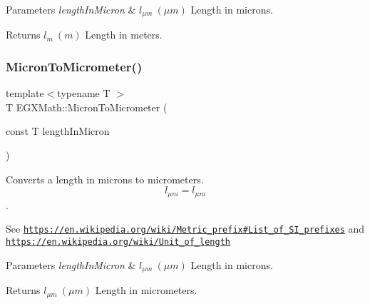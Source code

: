 \begin{DoxyParams}{Parameters}
{\em length\+In\+Micron} & $ l_{\mu m}\ (\mu m)$ Length in microns. \\
\hline
\end{DoxyParams}
\begin{DoxyReturn}{Returns}
$ l_{m}\ (m)$ Length in meters. 
\end{DoxyReturn}
\mbox{\label{group___e_g_x_math-_conversions-_length_conversions-_non-_s_i-_micron-_s_i_gaf65c3c52f13b30b32ae35c4b8edc30a8}} 
\subsubsection{\texorpdfstring{Micron\+To\+Micrometer()}{MicronToMicrometer()}}
{\footnotesize\ttfamily template$<$typename T $>$ \\
T E\+G\+X\+Math\+::\+Micron\+To\+Micrometer (\begin{DoxyParamCaption}\item[{const T}]{length\+In\+Micron }\end{DoxyParamCaption})}



Converts a length in microns to micrometers. \[ l_{\mu m}=l_{\mu m} \]. 

See \href{https://en.wikipedia.org/wiki/Metric_prefix#List_of_SI_prefixes}{\tt https\+://en.\+wikipedia.\+org/wiki/\+Metric\+\_\+prefix\#\+List\+\_\+of\+\_\+\+S\+I\+\_\+prefixes} and \href{https://en.wikipedia.org/wiki/Unit_of_length}{\tt https\+://en.\+wikipedia.\+org/wiki/\+Unit\+\_\+of\+\_\+length} 
\begin{DoxyParams}{Parameters}
{\em length\+In\+Micron} & $ l_{\mu m}\ (\mu m)$ Length in microns. \\
\hline
\end{DoxyParams}
\begin{DoxyReturn}{Returns}
$ l_{\mu m}\ (\mu m)$ Length in micrometers. 
\end{DoxyReturn}
\mbox{\label{group___e_g_x_math-_conversions-_length_conversions-_non-_s_i-_micron-_s_i_ga6dc810fc8f42b1a261023a8529eb68c3}} 
